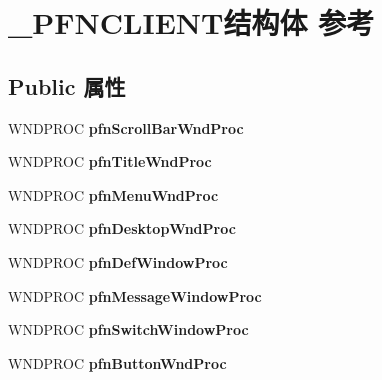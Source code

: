 \hypertarget{struct___p_f_n_c_l_i_e_n_t}{}\section{\+\_\+\+P\+F\+N\+C\+L\+I\+E\+N\+T结构体 参考}
\label{struct___p_f_n_c_l_i_e_n_t}
\subsection*{Public 属性}
\begin{DoxyCompactItemize}
\item 
\mbox{\label{struct___p_f_n_c_l_i_e_n_t_a0cfa4a5e484f9fae066c0132d5539075}} 
W\+N\+D\+P\+R\+OC {\bfseries pfn\+Scroll\+Bar\+Wnd\+Proc}
\item 
\mbox{\label{struct___p_f_n_c_l_i_e_n_t_a5bb7c966b93944bc6a12bcefc5ea49f4}} 
W\+N\+D\+P\+R\+OC {\bfseries pfn\+Title\+Wnd\+Proc}
\item 
\mbox{\label{struct___p_f_n_c_l_i_e_n_t_a65a211caade1d93d3c272df72d0c3be5}} 
W\+N\+D\+P\+R\+OC {\bfseries pfn\+Menu\+Wnd\+Proc}
\item 
\mbox{\label{struct___p_f_n_c_l_i_e_n_t_aef140accd2520a9a23ba83ea99092e39}} 
W\+N\+D\+P\+R\+OC {\bfseries pfn\+Desktop\+Wnd\+Proc}
\item 
\mbox{\label{struct___p_f_n_c_l_i_e_n_t_a647a4083cac587a4935799599b8c59ab}} 
W\+N\+D\+P\+R\+OC {\bfseries pfn\+Def\+Window\+Proc}
\item 
\mbox{\label{struct___p_f_n_c_l_i_e_n_t_a184bb30ecde2e39ad5157ff86fb8b0f3}} 
W\+N\+D\+P\+R\+OC {\bfseries pfn\+Message\+Window\+Proc}
\item 
\mbox{\label{struct___p_f_n_c_l_i_e_n_t_a7ec11d656742a1b104038e82473e9ca8}} 
W\+N\+D\+P\+R\+OC {\bfseries pfn\+Switch\+Window\+Proc}
\item 
\mbox{\label{struct___p_f_n_c_l_i_e_n_t_a71acd0626aba824a5cb3de16de20114c}} 
W\+N\+D\+P\+R\+OC {\bfseries pfn\+Button\+Wnd\+Proc}

\end{DoxyCompactItemize}
